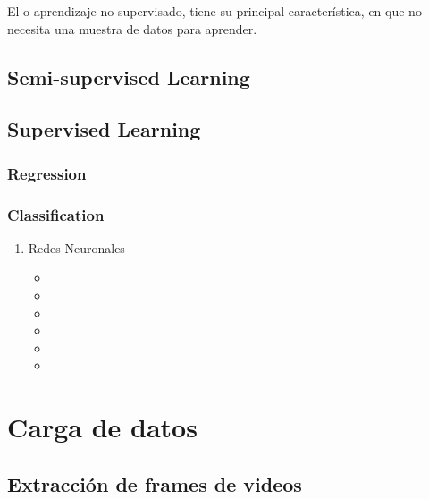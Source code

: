 El  o  aprendizaje no supervisado, tiene su principal característica, en que no necesita una muestra de datos para aprender.

\subsection{Semi-supervised Learning}

\subsection{Supervised Learning}

\subsubsection{Regression}

\subsubsection{Classification}

\begin{enumerate}
  \item Redes Neuronales

        \begin{itemize}
          \item {}
          \item {}
          \item {}
          \item {}
          \item {}
          \item {}
        \end{itemize}

\end{enumerate}


\section{Carga de datos}

\subsection{Extracción de frames de videos}

